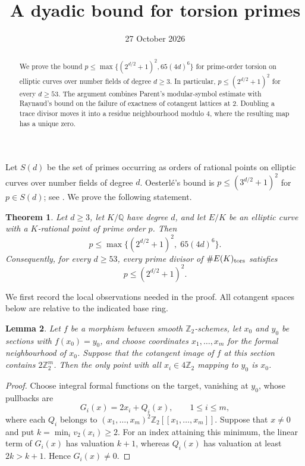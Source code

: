 \documentclass[11pt]{article}
\title{A dyadic bound for torsion primes}
\author{}
\date{27 October 2026}
\newtheorem{theorem}{Theorem}
\newtheorem{lemma}[theorem]{Lemma}
\theoremstyle{remark}\newtheorem{remark}[theorem]{Remark}
\newcommand{\Q}{\mathbb Q}\newcommand{\Z}{\mathbb Z}
\begin{document}
\maketitle
\begin{abstract}
We prove the bound
$p\leq\max\{(2^{d/2}+1)^2,65(4d)^6\}$ for prime-order torsion on
elliptic curves over number fields of degree $d\geq3$.
In particular, $p\leq(2^{d/2}+1)^2$ for every $d\geq53$.
The argument combines Parent's modular-symbol estimate with Raynaud's
bound on the failure of exactness of cotangent lattices at $2$.
Doubling a trace divisor moves it into a residue neighbourhood modulo $4$,
where the resulting map has a unique zero.
\end{abstract}

Let $S(d)$ be the set of primes occurring as orders of rational points
on elliptic curves over number fields of degree $d$.
Oesterl\'e's bound is
$p\leq(3^{d/2}+1)^2$ for $p\in S(d)$; see \cite[Section~6]{DKSS}.
We prove the following statement.

\begin{theorem}\label{thm:main}
Let $d\geq3$, let $K/\Q$ have degree $d$, and let $E/K$ be an elliptic
curve with a $K$-rational point of prime order $p$. Then
\[
 p\leq\max\bigl\{(2^{d/2}+1)^2,\;65(4d)^6\bigr\}.
\]
Consequently, for every $d\geq53$, every prime divisor of
$\#E(K)_{\rm tors}$ satisfies
\[
 p\leq(2^{d/2}+1)^2.
\]
\end{theorem}

We first record the local observations needed in the proof.
All cotangent spaces below are relative to the indicated base ring.

\begin{lemma}\label{lem:local}
Let $f$ be a morphism between smooth $\Z_2$-schemes, let $x_0$ and $y_0$
be sections with $f(x_0)=y_0$, and choose coordinates
$x_1,\ldots,x_m$ for the formal neighbourhood of $x_0$.
Suppose that the cotangent image of $f$ at this section contains
$2\Z_2^m$. Then the only point with all $x_i\in4\Z_2$ mapping to
$y_0$ is $x_0$.
\end{lemma}
\begin{proof}
Choose integral formal functions on the target, vanishing at $y_0$,
whose pullbacks are
\[
 G_i(x)=2x_i+Q_i(x),\qquad 1\leq i\leq m,
\]
where each $Q_i$ belongs to $(x_1,\ldots,x_m)^2\Z_2[[x_1,\ldots,x_m]]$.
Suppose that $x\ne0$ and put $k=\min_i v_2(x_i)\geq2$.
For an index attaining this minimum, the linear term of $G_i(x)$ has
valuation $k+1$, whereas $Q_i(x)$ has valuation at least $2k>k+1$.
Hence $G_i(x)\ne0$.
\end{proof}
\end{document}
